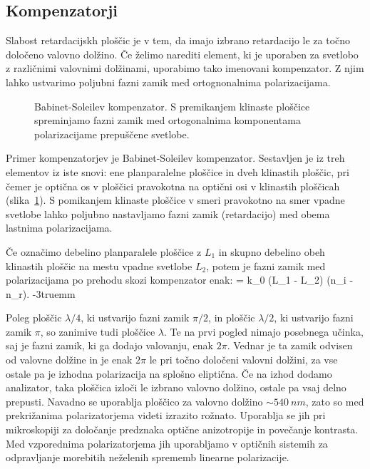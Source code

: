 \subsection*{Kompenzatorji}
Slabost retardacijskh ploščic je v tem, da imajo izbrano retardacijo le za 
točno določeno valovno dolžino. Če želimo narediti element, ki je uporaben za svetlobo z 
različnimi valovnimi dolžinami, uporabimo tako imenovani kompenzator. Z njim lahko 
ustvarimo poljubni fazni zamik med ortognonalnima polarizacijama. 
\begin{figure}[!h]
\centering
\def\svgwidth{80truemm} 

\caption{Babinet-Soleilev kompenzator. S premikanjem klinaste ploščice spreminjamo
fazni zamik med ortogonalnima komponentama polarizacijame prepuščene svetlobe.}
\label{fig:10_Soleil}
\end{figure}

Primer kompenzatorjev je Babinet-Soleilev kompenzator.
Sestavljen je iz treh elementov iz iste snovi: ene planparalelne ploščice in dveh klinastih ploščic, 
pri čemer je optična os v ploščici pravokotna na optični osi v klinastih ploščicah 
(slika~\ref{fig:10_Soleil}). S pomikanjem klinaste ploščice v smeri pravokotno na smer vpadne 
svetlobe lahko poljubno nastavljamo fazni zamik (retardacijo) med obema lastnima polarizacijama.

Če označimo debelino planparalele ploščice z $L_1$ in skupno debelino obeh klinastih ploščic
na mestu vpadne svetlobe $L_2$, potem je fazni zamik med polarizacijama po prehodu skozi kompenzator
enak:
\beq
\Delta \phi = k_0 (L_1 - L_2) (n_i - n_r).
\eeq
\vglue-3truemm
\begin{remark}
Poleg ploščic $\lambda/4$, ki ustvarijo fazni zamik $\pi/2$, in ploščic $\lambda/2$,
ki ustvarijo fazni zamik $\pi$, so zanimive tudi ploščice $\lambda$. Te na prvi pogled nimajo
posebnega učinka, saj je fazni zamik, ki ga dodajo valovanju, enak $2\pi$. Vednar je ta zamik odvisen
od valovne dolžine in je enak $2\pi$ le pri točno določeni valovni dolžini,
za vse ostale pa je izhodna polarizacija na splošno eliptična. Če na izhod dodamo 
analizator, taka ploščica izloči le izbrano valovno dolžino, ostale pa vsaj delno prepusti. 
Navadno se uporablja ploščico za valovno dolžino $\sim 540~\si{nm}$, zato so med prekrižanima
polarizatorjema videti izrazito rožnato. Uporablja se jih pri mikroskopiji za določanje predznaka
optične anizotropije in povečanje kontrasta. Med vzporednima polarizatorjema jih uporabljamo
v optičnih sistemih za odpravljanje morebitih neželenih sprememb linearne polarizacije. 
\end{remark}

